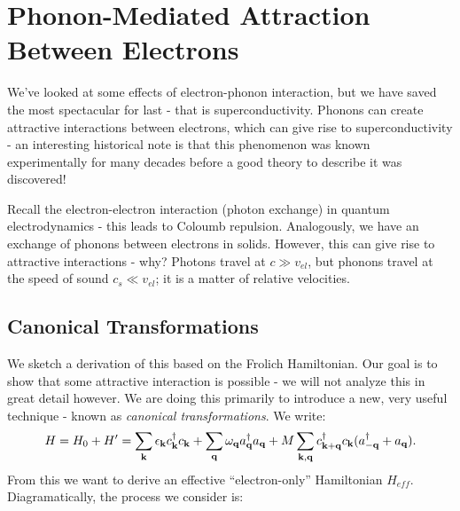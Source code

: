 \section{Phonon-Mediated Attraction Between Electrons}

We've looked at some effects of electron-phonon interaction, but we have saved the most spectacular for last - that is superconductivity. Phonons can create attractive interactions between electrons, which can give rise to superconductivity - an interesting historical note is that this phenomenon was known experimentally for many decades before a good theory to describe it was discovered!

Recall the electron-electron interaction (photon exchange) in quantum electrodynamics - this leads to Coloumb repulsion. Analogously, we have an exchange of phonons between electrons in solids. However, this can give rise to attractive interactions - why? Photons travel at $c \gg v_{el}$, but phonons travel at the speed of sound $c_s \ll v_{el}$; it is a matter of relative velocities.

\subsection{Canonical Transformations}
We sketch a derivation of this based on the Frolich Hamiltonian. Our goal is to show that some attractive interaction is possible - we will not analyze this in great detail however. We are doing this primarily to introduce a new, very useful technique - known as \emph{canonical transformations}. We write:
\begin{equation}
    H = H_0 + H' = \sum_{\mathbf{k}}\epsilon_{\mathbf{k}}c^\dagger_{\mathbf{k}}c_{\mathbf{k}} + \sum_{\mathbf{q}}\omega_{\mathbf{q}}a^\dagger_{\mathbf{q}}a_{\mathbf{q}} + M\sum_{\mathbf{k}, \mathbf{q}}c^{\dagger}_{\mathbf{k} + \mathbf{q}}c_{\mathbf{k}}(a^\dagger_{-\mathbf{q}} + a_{\mathbf{q}}).
\end{equation}
From this we want to derive an effective ``electron-only'' Hamiltonian $H_{eff}$. Diagramatically, the process we consider is:

